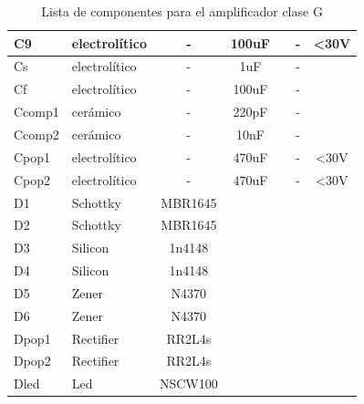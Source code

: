 \begin{table}[]
\begin{tabular}{|l|l|c|c|c|c|c|}
C9            & electrolítico     & -        & 100uF         &             & -                & \textless{}30V \\ \hline
Cs            & electrolítico     & -        & 1uF           &             & -                &                \\ \hline
Cf            & electrolítico     & -        & 100uF         &             & -                &                \\ \hline
Ccomp1        & cerámico          & -        & 220pF         &             & -                &                \\ \hline
Ccomp2        & cerámico          & -        & 10nF          &             & -                &                \\ \hline
Cpop1         & electrolítico     & -        & 470uF         &             & -                & \textless{}30V \\ \hline
Cpop2         & electrolítico     & -        & 470uF         &             & -                & \textless{}30V \\ \hline \hline
D1            & Schottky          & MBR1645  &               &             &                  &                \\ \hline
D2            & Schottky          & MBR1645  &               &             &                  &                \\ \hline
D3            & Silicon           & 1n4148   &               &             &                  &                \\ \hline
D4            & Silicon           & 1n4148   &               &             &                  &                \\ \hline
D5            & Zener             & N4370    &               &             &                  &                \\ \hline
D6            & Zener             & N4370    &               &             &                  &                \\ \hline
Dpop1         & Rectifier         & RR2L4s   &               &             &                  &                \\ \hline
Dpop2         & Rectifier         & RR2L4s   &               &             &                  &                \\ \hline
Dled          & Led               & NSCW100  &               &             &                  & \\ \hline 
\end{tabular}
\caption{Lista de componentes para el amplificador clase G}
\label{tab::lista_componentes}
\end{table}

